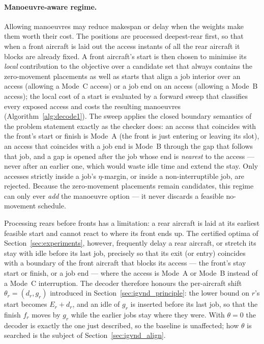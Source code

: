 \paragraph{Manoeuvre-aware regime.}
Allowing manoeuvres may reduce makespan or delay when the weights make
them worth their cost.  The positions are processed
deepest-rear first, so that when a front aircraft is laid out the access
instants of all the rear aircraft it blocks are already fixed.  A front
aircraft's start is then chosen to minimise its \emph{local} contribution
to the objective over a candidate set that always contains the
zero-movement placements as well as starts that align a job interior over
an access (allowing a Mode~C access) or a job end on an access (allowing
a Mode~B access); the local cost of a start is evaluated by a forward sweep
that classifies every exposed access and costs the resulting manoeuvres
(Algorithm~\ref{alg:decode1}).  The sweep applies the closed boundary
semantics of the problem statement exactly as the checker does: an access
that coincides with the front's start or finish is Mode~A (the front is
just entering or leaving its slot), an access that coincides with a job
end is Mode~B through the gap that follows that job, and a gap is opened
after the job whose end is \emph{nearest} to the access --- never after an
earlier one, which would waste idle time and extend the stay.  Only
accesses strictly inside a job's $\eta$-margin, or inside a
non-interruptible job, are rejected.  Because the zero-movement
placements remain candidates, this regime can only ever \emph{add} the
manoeuvre option --- it never discards a feasible no-movement schedule.

Processing rears before fronts has a limitation: a rear aircraft is laid
at its earliest feasible start and cannot react to where its front ends
up.  The certified optima of Section~\ref{sec:experiments}, however,
frequently delay a rear aircraft, or stretch its stay with idle before its
last job, precisely so that its exit (or entry) coincides with a boundary
of the front aircraft that blocks its access --- the front's stay start or finish, or a job end
--- where the access is Mode~A or Mode~B instead of a Mode~C
interruption.  The decoder therefore honours the per-aircraft shift
$\theta_r = (d_r, g_r)$ introduced in Section~\ref{sec:igvnd_principle}: the
lower bound on $r$'s start becomes $E_r + d_r$, and an idle of $g_r$ is
inserted before its last job, so that the finish $f_r$ moves by $g_r$
while the earlier jobs stay where they were.  With $\theta = 0$ the
decoder is exactly the one just described, so the baseline is unaffected;
how $\theta$ is searched is the subject of Section~\ref{sec:igvnd_align}.

